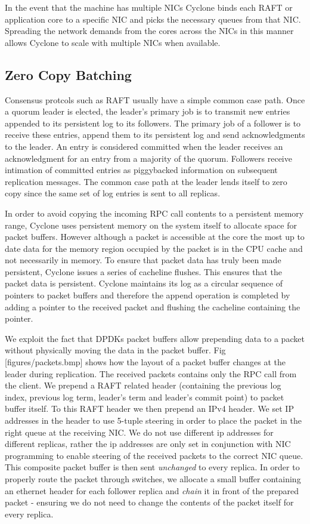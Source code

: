 \documentclass[letterpaper,twocolumn,10pt]{article}
\begin{document}
In the event that the machine has multiple NICs Cyclone binds each RAFT or
application core to a specific NIC and picks the necessary queues from that
NIC. Spreading the network demands from the cores across the NICs in this manner
allows Cyclone to scale with multiple NICs when available.

\subsection{Zero Copy Batching}
Consensus protcols such as RAFT usually have a simple common case path. Once a
quorum leader is elected, the leader's primary job is to transmit new entries
appended to its persistent log to its followers. The primary job of a follower
is to receive these entries, append them to its persistent log and send
acknowledgments to the leader. An entry is considered committed when the leader
receives an acknowledgment for an entry from a majority of the quorum. Followers
receive intimation of committed entries as piggybacked information on subsequent
replication messages. The common case path at the leader lends itself to zero
copy since the same set of log entries is sent to all replicas.

In order to avoid copying the incoming RPC call contents to a persistent memory
range, Cyclone uses persistent memory on the system itself to allocate space for
packet buffers. However although a packet is accessible at the core the most up
to date data for the memory region occupied by the packet is in the CPU cache
and not necessarily in memory. To ensure that packet data has truly been made
persistent, Cyclone issues a series of cacheline flushes. This ensures that the
packet data is persistent. Cyclone maintains its log as a circular sequence of
pointers to packet buffers and therefore the append operation is completed by
adding a pointer to the received packet and flushing the cacheline containing
the pointer.

We exploit the fact that DPDKs packet buffers allow prepending data to a packet
without physically moving the data in the packet buffer. Fig
[figures/packets.bmp] shows how the layout of a packet buffer changes at the
leader during replication. The received packets contains only the RPC call from
the client. We prepend a RAFT related header (containing the previous log index,
previous log term, leader's term and leader's commit point) to packet buffer
itself. To this RAFT header we then prepend an IPv4 header. We set IP addresses
in the header to use 5-tuple steering in order to place the packet in the right
queue at the receiving NIC. We do not use different ip addresses for different
replicas, rather the ip addresses are only set in conjunction with NIC
programming to enable steering of the received packets to the correct NIC queue.
This composite packet buffer is then sent \emph{unchanged} to every replica. In
order to properly route the packet through switches, we allocate a small buffer
containing an ethernet header for each follower replica and \emph{chain} it in
front of the prepared packet - ensuring we do not need to change the contents of
the packet itself for every replica.
\end{document}
